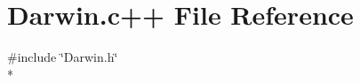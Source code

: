 \hypertarget{Darwin_8c_09_09}{\section{Darwin.\-c++ File Reference}
\label{Darwin_8c_09_09}
}
{\ttfamily \#include \char`\"{}Darwin.\-h\char`\"{}}\\*
